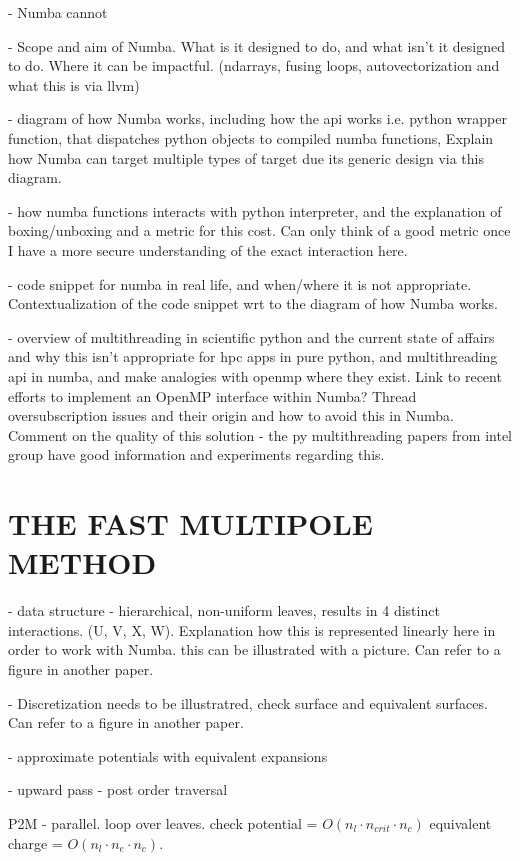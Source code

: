\documentclass{IEEEcsmag}
\begin{document}
- Numba cannot

- Scope and aim of Numba. What is it designed to do, and what isn't it designed to do. Where it can be impactful. (ndarrays, fusing loops, autovectorization and what this is via llvm)

- diagram of how Numba works, including how the api works i.e. python wrapper function, that dispatches python objects to compiled numba functions, Explain how Numba can target multiple types of target due its generic design via this diagram.

- how numba functions interacts with python interpreter, and the explanation of boxing/unboxing and a metric for this cost. Can only think of a good metric once I have a more secure understanding of the exact interaction here.

- code snippet for numba in real life, and when/where it is not appropriate. Contextualization of the code snippet wrt to the diagram of how Numba works.

- overview of multithreading in scientific python and the current state of affairs and why this isn't appropriate for hpc apps in pure python, and multithreading api in numba, and make analogies with openmp where they exist. Link to recent efforts to implement an OpenMP interface within Numba? Thread oversubscription issues and their origin and how to avoid this in Numba. Comment on the quality of this solution - the py multithreading papers from intel group have good information and experiments regarding this.

\section{THE FAST MULTIPOLE METHOD}

- data structure - hierarchical, non-uniform leaves, results in 4 distinct interactions. (U, V, X, W). Explanation how this is represented linearly here in order to work with Numba.
this can be illustrated with a picture. Can refer to a figure in another paper.

- Discretization needs to be illustratred, check surface and equivalent surfaces. Can refer to a figure in another paper.

- approximate potentials with equivalent expansions

- upward pass - post order traversal

P2M
- parallel. loop over leaves. check potential = $O(n_l \cdot n_{crit} \cdot n_c)$ equivalent charge = $O(n_l \cdot n_e \cdot  n_c)$.
\end{document}
